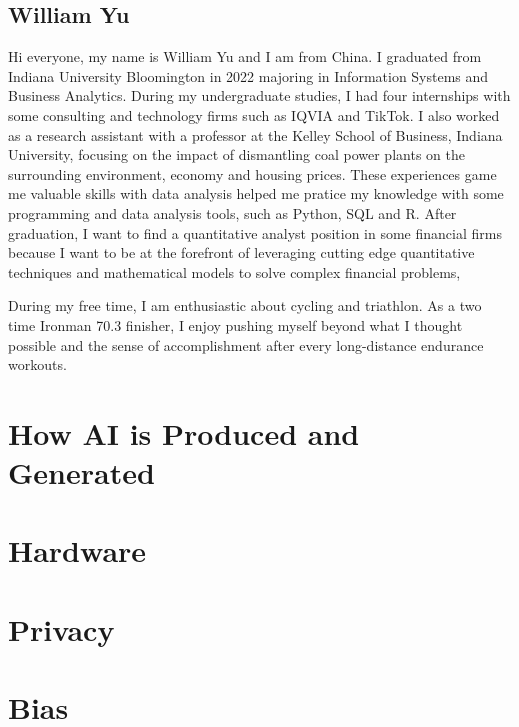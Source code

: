 \documentclass[
]{book}
\begin{document}
\hypertarget{william-yu}{%
\section{William Yu}\label{william-yu}}

Hi everyone, my name is William Yu and I am from China. I graduated from Indiana University Bloomington in 2022 majoring in Information Systems and Business Analytics. During my undergraduate studies, I had four internships with some consulting and technology firms such as IQVIA and TikTok. I also worked as a research assistant with a professor at the Kelley School of Business, Indiana University, focusing on the impact of dismantling coal power plants on the surrounding environment, economy and housing prices. These experiences game me valuable skills with data analysis helped me pratice my knowledge with some programming and data analysis tools, such as Python, SQL and R. After graduation, I want to find a quantitative analyst position in some financial firms because I want to be at the forefront of leveraging cutting edge quantitative techniques and mathematical models to solve complex financial problems,

During my free time, I am enthusiastic about cycling and triathlon. As a two time Ironman 70.3 finisher, I enjoy pushing myself beyond what I thought possible and the sense of accomplishment after every long-distance endurance workouts.

\hypertarget{how-ai-is-produced-and-generated}{%
\chapter{How AI is Produced and Generated}\label{how-ai-is-produced-and-generated}}

\hypertarget{hardware}{%
\chapter{Hardware}\label{hardware}}

\hypertarget{privacy}{%
\chapter{Privacy}\label{privacy}}

\hypertarget{bias}{%
\chapter{Bias}\label{bias}}
\end{document}
